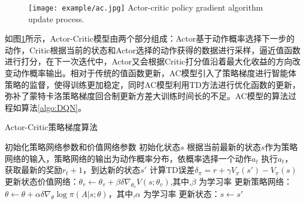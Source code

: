 \begin{figure}[htpb]
	\centering
	\texttt{[image: example/ac.jpg]}
	{Actor-critic policy gradient algorithm update process.}
	\label{fig:ac}
\end{figure}
如图\ref{fig:ac}所示，Actor-Critic模型由两个部分组成：Actor基于动作概率选择下一步的动作，Critic根据当前的状态和Actor选择的动作获得的数据进行采样，逼近值函数进行打分，在下一次迭代中，Actor又会根据Critic打分值沿着最大化收益的方向改变动作概率输出。相对于传统的值函数更新，AC模型引入了策略梯度进行智能体策略的监督，使得训练更加稳定，同时AC模型利用TD方法进行优化函数的更新，弥补了蒙特卡洛策略梯度回合制更新方差大训练时间长的不足。AC模型的算法过程如算法\ref{algo:DQN}。
\begin{algorithm}[htbp]
	\caption{Actor-Critic策略梯度算法}
	\label{algo:DQN}
	\begin{algorithmic}[1] %
		\State 初始化策略网络参数和价值网络参数
		\State 初始化状态$ {s}$
		\State 根据当前最新的状态$ {s}$作为策略网络的输入，策略网络的输出为动作概率分布，依概率选择一个动作$ a_t $
		\State 执行$a_t $，获取最新的奖励$ r_t+1 $，到达新的状态$ {s'}$
		\State 计算TD误差${\delta _\pi } = r + \gamma {V_\pi }(s') - {V_\pi }(s)$
		\State 更新状态价值网络：${\theta _v} \leftarrow {\theta _v} + \beta \delta {\nabla _{{\theta _v}}}V(s;{\theta _v})$,其中,$\beta$ 为学习率
		\State 更新策略网络：$\theta  \leftarrow \theta  + \alpha \delta {\nabla _\theta }\log \pi (A|s;\theta )$，其中,$\alpha$ 为学习率
		\State 更新状态：$ s \leftarrow s'$
		\EndFor
		\EndFor
	\end{algorithmic}
\end{algorithm}

